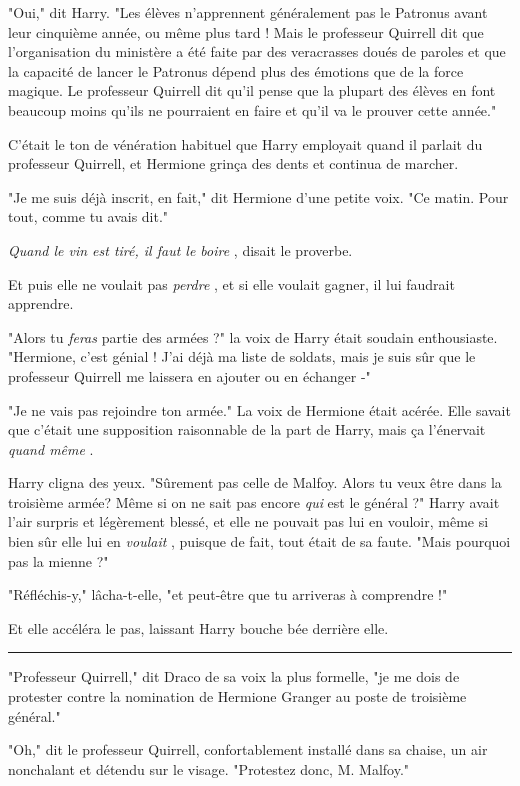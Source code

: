 "Oui," dit Harry. "Les élèves n'apprennent généralement pas le Patronus avant leur cinquième année, ou même plus tard ! Mais le professeur Quirrell dit que l'organisation du ministère a été faite par des veracrasses doués de paroles et que la capacité de lancer le Patronus dépend plus des émotions que de la force magique. Le professeur Quirrell dit qu'il pense que la plupart des élèves en font beaucoup moins qu'ils ne pourraient en faire et qu'il va le prouver cette année."

C'était le ton de vénération habituel que Harry employait quand il parlait du professeur Quirrell, et Hermione grinça des dents et continua de marcher.

"Je me suis déjà inscrit, en fait," dit Hermione d'une petite voix. "Ce matin. Pour tout, comme tu avais dit."

\emph{Quand le vin est tiré, il faut le boire} , disait le proverbe.

Et puis elle ne voulait pas \emph{perdre} , et si elle voulait gagner, il lui faudrait apprendre.

"Alors tu \emph{feras}  partie des armées ?" la voix de Harry était soudain enthousiaste. "Hermione, c'est génial ! J'ai déjà ma liste de soldats, mais je suis sûr que le professeur Quirrell me laissera en ajouter ou en échanger -"

"Je ne vais pas rejoindre ton armée." La voix de Hermione était acérée. Elle savait que c'était une supposition raisonnable de la part de Harry, mais ça l'énervait \emph{quand même} .

Harry cligna des yeux. "Sûrement pas celle de Malfoy. Alors tu veux être dans la troisième armée? Même si on ne sait pas encore \emph{qui}  est le général ?" Harry avait l'air surpris et légèrement blessé, et elle ne pouvait pas lui en vouloir, même si bien sûr elle lui en \emph{voulait} , puisque de fait, tout était de sa faute. "Mais pourquoi pas la mienne ?"

"Réfléchis-y," lâcha-t-elle, "et peut-être que tu arriveras à comprendre !"

Et elle accéléra le pas, laissant Harry bouche bée derrière elle.
\par\noindent\rule{\textwidth}{0.4pt}
"Professeur Quirrell," dit Draco de sa voix la plus formelle, "je me dois de protester contre la nomination de Hermione Granger au poste de troisième général."

"Oh," dit le professeur Quirrell, confortablement installé dans sa chaise, un air nonchalant et détendu sur le visage. "Protestez donc, M. Malfoy."

